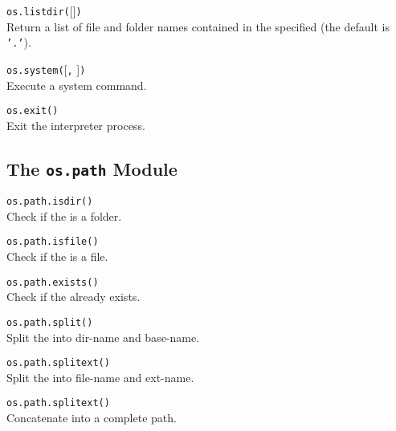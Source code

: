 \hangpar \texttt{os.listdir(}[]\texttt{)} \\
Return a list of file and folder names contained in the specified  (the default is \texttt{'.'}).

\hangpar \texttt{os.system(}[\texttt{,} ]\texttt{)} \\
Execute a system command.

\hangpar \texttt{os.exit()}\\
Exit the interpreter process.

\subsection*{The \texttt{os.path} Module}

\hangpar \texttt{os.path.isdir(}\texttt{)} \\
Check if the  is a folder.

\hangpar \texttt{os.path.isfile(}\texttt{)} \\
Check if the  is a file.

\hangpar \texttt{os.path.exists(}\texttt{)} \\
Check if the  already exists.

\hangpar \texttt{os.path.split(}\texttt{)} \\
Split the  into dir-name and base-name.

\hangpar \texttt{os.path.splitext(}\texttt{)} \\
Split the  into file-name and ext-name.

\hangpar \texttt{os.path.splitext(}\texttt{)} \\
Concatenate  into a complete path.
